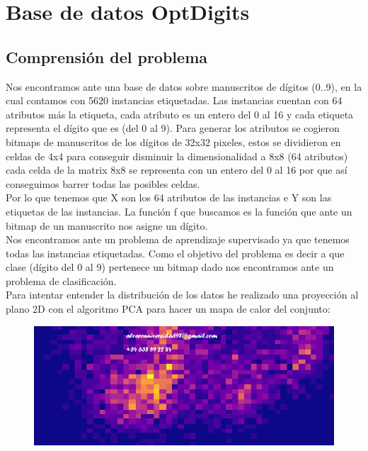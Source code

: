 \documentclass[a4paper,11pt]{article}
\begin{document}
\section{Base de datos OptDigits}

\subsection{Comprensión del problema}

Nos encontramos ante una base de datos sobre manuscritos de dígitos (0..9), en la cual contamos con 5620 instancias etiquetadas. Las instancias cuentan con 64 atributos más la etiqueta, cada atributo es un entero del 0 al 16 y cada etiqueta representa el dígito que es (del 0 al 9). Para generar los atributos se cogieron bitmaps de manuscritos de los dígitos de 32x32 pixeles, estos se dividieron en celdas de 4x4 para conseguir disminuir la dimensionalidad a 8x8 (64 atributos) cada celda de la matrix 8x8 se representa con un entero del 0 al 16 por que así conseguimos barrer todas las posibles celdas.\\

Por lo que tenemos que X son los 64 atributos de las instancias e Y son las etiquetas de las instancias. La función f que buscamos es la función que ante un bitmap de un manuscrito nos asigne un dígito.\\

Nos encontramos ante un problema de aprendizaje supervisado ya que tenemos todas las instancias etiquetadas. Como el objetivo del problema es decir a que clase (dígito del 0 al 9) pertenece un bitmap dado nos encontramos ante un problema de clasificación. \\

Para intentar entender la distribución de los datos he realizado una proyección al plano 2D con el algoritmo PCA para hacer un mapa de calor del conjunto:\\

\begin{figure}[h]
\includegraphics[scale=0.63]{heatmap}
\centering
\end{figure}
\end{document}
